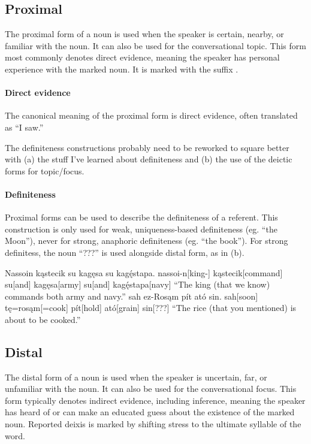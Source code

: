 \subsection{Proximal}
The proximal form of a noun is used when the speaker is certain, nearby, or familiar with the noun. It can also be used for the conversational topic. This form most commonly denotes direct evidence, meaning the speaker has personal experience with the marked noun. It is marked with the suffix . 

\paragraph{Direct evidence}
The canonical meaning of the proximal form is direct evidence, often translated as “I saw.” 

\begin{kaobox}[frametitle=\sc todo:]
    The definiteness constructions probably need to be reworked to square better with (a) the stuff I've learned about definiteness and (b) the use of the deictic forms for topic/focus.
\end{kaobox}

\paragraph{Definiteness}
Proximal forms can be used to describe the definiteness of a referent. This construction is only used for weak, uniqueness-based definiteness (eg. “the Moon”), never for strong, anaphoric definiteness (eg. “the book”). For strong definitess, the noun  “???” is used alongside distal form, as in (\nextx b).

\begin{gloss*}
\a \begingl
\glpreamble Nassoin kąstecik su kagęsa su kagę́stapa. \endpreamble
nassoi-n[king-]
kąstecik[command]
su[and]
kagęsa[army]
su[and]
kagę́stapa[navy]
\glft “The king (that we know) commands both army and navy.”
\endgl
\a \begingl
\glpreamble sah ez-Rosąm pít ató sin. \endpreamble
sah[soon]
tę=rosąm[=cook]
pít[hold\gbs{}]
ató[grain\gbs{}]
sin[???]
\glft “The rice (that you mentioned) is about to be cooked.”
\endgl
\end{gloss*}

\subsection{Distal}
The distal form of a noun is used when the speaker is uncertain, far, or unfamiliar with the noun. It can also be used for the conversational focus. This form typically denotes indirect evidence, including inference, meaning the speaker has heard of or can make an educated guess about the existence of the marked noun. Reported deixis is marked by shifting stress to the ultimate syllable of the word.

